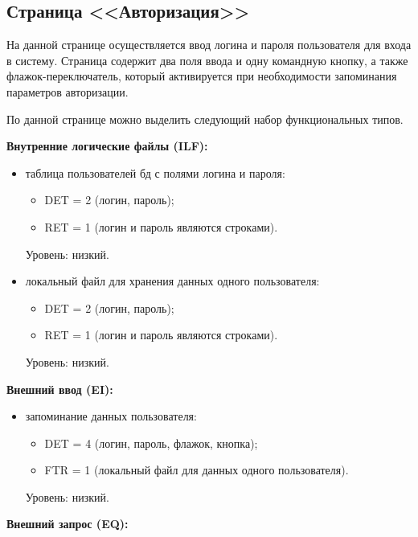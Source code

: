 \clearpage

\subsection{Страница <<Авторизация>>}


На данной странице осуществляется ввод логина и пароля пользователя для
входа в систему. Страница содержит два поля ввода и одну командную кнопку, а также флажок-переключатель, который активируется при необходимости запоминания параметров авторизации. 

По данной странице можно выделить следующий набор функциональных типов.

\textbf{Внутренние логические файлы (ILF):}

\begin{itemize}
    \item таблица пользователей бд с полями логина и пароля:
    \begin{itemize}
        \item DET = 2 (логин, пароль);
        \item RET = 1 (логин и пароль являются строками).
    \end{itemize}
    Уровень: низкий.

    \item локальный файл для хранения данных одного пользователя:
    \begin{itemize}
        \item DET = 2 (логин, пароль);
        \item RET = 1 (логин и пароль являются строками).
    \end{itemize}
    Уровень: низкий.
\end{itemize}

\textbf{Внешний ввод (EI):}

\begin{itemize}
    \item запоминание данных пользователя:
    \begin{itemize}
        \item DET = 4 (логин, пароль, флажок, кнопка);
        \item FTR = 1 (локальный файл для данных одного пользователя).
    \end{itemize}
    Уровень: низкий.
\end{itemize}

\textbf{Внешний запрос (EQ):}

